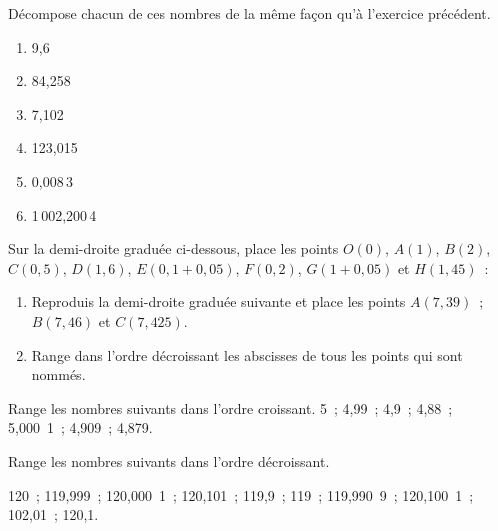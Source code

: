 \begin{exercice}
Décompose chacun de ces nombres de la même façon qu'à l'exercice précédent.
\begin{enumerate} %
 \item 9,6
 \item 84,258
 \item 7,102
 \item 123,015
 \item 0,008\,3
 \item 1\,002,200\,4
 \end{enumerate}
\end{exercice}


\begin{exercice}
Sur la demi-droite graduée ci-dessous, place les points $O(0)$, $A(1)$, $B(2)$, $C(0,5)$, $D(1,6)$, $E(0,1 + 0,05)$, $F(0,2)$, $G(1 + 0,05)$ et $H(1,45)$ :
\end{exercice}



\begin{exercice}
\begin{enumerate}
 \item Reproduis la demi-droite graduée suivante et place les points $A(7,39)$ ; $B(7,46)$ et $C(7,425)$.
 \item Range dans l'ordre décroissant les abscisses de tous les points qui sont nommés.
 \end{enumerate}
\end{exercice}


\begin{exercice}[Rangement]
Range les nombres suivants dans l'ordre croissant.
5 ; 4,99 ; 4,9 ; 4,88 ; 5,000 1 ; 4,909 ; 4,879.

\dotfill

\dotfill
\end{exercice}


\begin{exercice}
Range les nombres suivants dans l'ordre décroissant.

120 ; 119,999 ; 120,000 1 ; 120,101 ; 119,9 ; 119 ; 119,990 9 ; 120,100 1 ; 102,01 ; 120,1.

\dotfill

\dotfill
\end{exercice}



